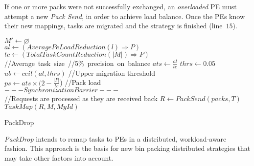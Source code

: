 If one or more packs were not successfully exchanged, an \textit{overloaded} PE must attempt a new \textit{Pack Send}, in order to achieve load balance.
Once the PEs know their new mappings, tasks are migrated and the strategy is finished (line~$15$). 

\begin{algorithm}
	\DontPrintSemicolon
    $  M' \gets \varnothing$\\
    $al \gets (AveragePeLoadReduction(l)\Rightarrow  P)$ \\
    $tc \gets (TotalTaskCountReduction(|  M|)\Rightarrow  P)$\\
    //Average~task~size~\quad//5\%~precision~on~balance\qquad
    $ats\gets \frac{al}{tc}$ \qquad\qquad $thrs \gets 0.05$\\
    $ub \gets ceil(al,thrs)$ \qquad //Upper migration threshold\\
    $ps \gets ats\times (2-\frac{|  P|}{tc}$) \qquad\qquad //Pack load\\
    $---Synchronization Barrier---$\\
    //Requests are processed as they are received back
    $R \gets PackSend(packs, T)$\\
    $TaskMap(R,   M, MyId)$
    \caption{PackDrop}
    \label{algo:packdrop}    
\end{algorithm}

\textit{PackDrop} intends to remap tasks to PEs in a distributed, workload-aware fashion.
This approach is the basis for new bin packing distributed strategies that may take other factors into account.

